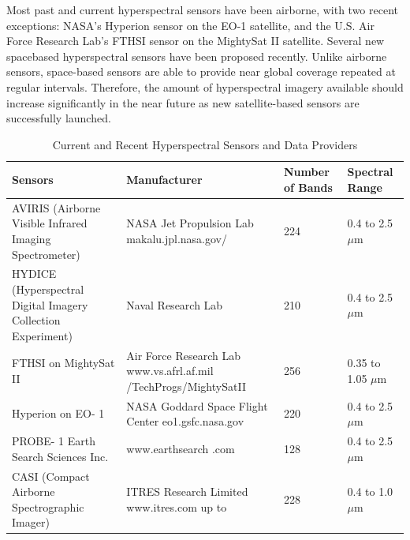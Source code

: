\documentclass[document.tex]{subfiles}
\begin{document}
\noindent Most past and current hyperspectral sensors have been airborne, with two
recent exceptions: NASA’s Hyperion sensor on the EO-1 satellite, and the U.S. Air
Force Research Lab’s FTHSI sensor on the MightySat II satellite. Several new spacebased
hyperspectral sensors have been proposed recently. Unlike airborne
sensors, space-based sensors are able to provide near global coverage repeated at regular
intervals. Therefore, the amount of hyperspectral imagery available should increase
significantly in the near future as new satellite-based sensors are successfully launched.
\begin{table}[H]
	\caption{Current and Recent Hyperspectral Sensors and Data Providers}
	\begin{center}
		\begin{tabularx}{\columnwidth}{|X|X|X|X|}
			\hline
			Sensors & Manufacturer & Number of
			Bands &
			Spectral Range\\ \hline
			
			AVIRIS
			(Airborne
			Visible
			Infrared
			Imaging
			Spectrometer) &
			NASA Jet
			Propulsion Lab
			makalu.jpl.nasa.gov/ &
			224 & 0.4 to 2.5 $\mu$m\\ \hline
			
			HYDICE
			(Hyperspectral
			Digital
			Imagery
			Collection
			Experiment) &
			Naval Research Lab & 210 & 0.4 to 2.5 $\mu$m \\ \hline
			
			FTHSI on
			MightySat
			II &
			Air Force Research
			Lab www.vs.afrl.af.mil
			/TechProgs/MightySatII &
			256  & 0.35 to 1.05 $\mu$m \\ \hline
			Hyperion
			on EO- 1 &
			NASA Goddard
			Space Flight Center
			eo1.gsfc.nasa.gov &
			220 & 0.4 to 2.5 $\mu$m\\ \hline
			
			PROBE-
			1 Earth
			Search
			Sciences
			Inc. &
			www.earthsearch .com & 128 & 0.4 to 2.5 $\mu$m\\ \hline
			
			CASI (Compact
			Airborne
			Spectrographic
			Imager) &
			ITRES Research Limited
			www.itres.com
			up to  & 228 & 0.4 to 1.0$\mu$m\\ \hline
		\end{tabularx}
	\end{center}
	\label{tab:Current and Recent Hyperspectral Sensors and Data Providers}
\end{table}
\clearpage
\end{document}
